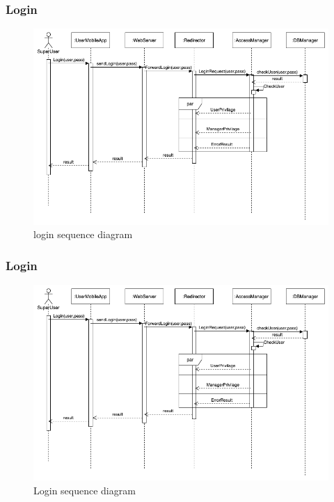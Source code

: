 \vspace{1cm}

\subsubsection{Login}
\begin{figure}[H]
  \centering
  \includegraphics[width=\textwidth, keepaspectratio]{images/sequences/Login.png}
  \caption{login sequence diagram}
\end{figure}
\vspace{2cm}

\subsubsection{Login}
\begin{figure}[H]
  \centering
  \includegraphics[width=\textwidth, keepaspectratio]{images/sequences/Login.png}
  \caption{Login sequence diagram}
\end{figure}
\vspace{2cm}

